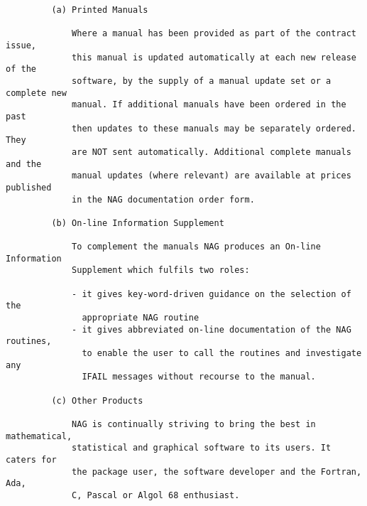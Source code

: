 \begin{small}
\begin{verbatim}
         (a) Printed Manuals                                                    
                                                                                
             Where a manual has been provided as part of the contract issue,    
             this manual is updated automatically at each new release of the    
             software, by the supply of a manual update set or a complete new   
             manual. If additional manuals have been ordered in the past        
             then updates to these manuals may be separately ordered. They      
             are NOT sent automatically. Additional complete manuals and the    
             manual updates (where relevant) are available at prices published  
             in the NAG documentation order form.                               
                                                                                
         (b) On-line Information Supplement                                     
                                                                                
             To complement the manuals NAG produces an On-line Information      
             Supplement which fulfils two roles:                                
                                                                                
             - it gives key-word-driven guidance on the selection of the        
               appropriate NAG routine                                          
             - it gives abbreviated on-line documentation of the NAG routines,  
               to enable the user to call the routines and investigate any      
               IFAIL messages without recourse to the manual.                   
                                                                                
         (c) Other Products                                                     
                                                                                
             NAG is continually striving to bring the best in mathematical,     
             statistical and graphical software to its users. It caters for     
             the package user, the software developer and the Fortran, Ada,     
             C, Pascal or Algol 68 enthusiast.                                  
                                                                                

\end{verbatim}
\end{small}
